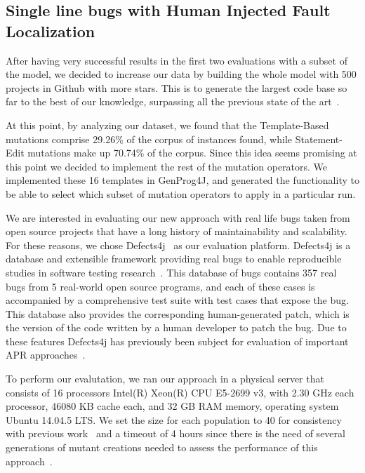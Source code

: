 \documentclass[conference]{IEEEtran}
\begin{document}
\subsection{Single line bugs with Human Injected Fault Localization}
\label{sec:single}

After having very successful results in the first two evaluations with a subset of the model, we decided 
to increase our data by building the whole model with 500 projects in Github with more 
stars. This is to generate the largest code base so far to the best 
of our knowledge, surpassing all the previous state of the 
art~\cite{long15,Soto15,zhong15,matias15,xuan16}. 

At this point, by analyzing our dataset, 
we found that the Template-Based mutations comprise 29.26\% of the corpus of 
instances found, while Statement-Edit mutations make up 70.74\% of the 
corpus. Since this idea seems promising at this point we decided to implement the rest 
of the mutation operators. We implemented these 16 templates in GenProg4J, and generated the functionality 
to be able to select which subset of mutation operators to apply in a particular 
run.

We are interested in evaluating our new approach with real life bugs taken from 
open source projects that have a long history of maintainability and 
scalability. For these reasons, we chose Defects4j~\cite{just14} as our 
evaluation platform. Defects4j is a database and extensible 
framework providing real bugs to enable reproducible studies in software testing 
research~\cite{just14}. This database of bugs contains 357 real bugs from 5 
real-world open source programs, and each of these cases is accompanied by a 
comprehensive test suite with test cases that expose the bug. This database also provides 
the corresponding human-generated patch, which is the version of the code written by a human 
developer to patch the bug. Due to these features Defects4j has previously been 
subject for evaluation of important APR approaches~\cite{Durieux15}.

To perform our evalutation, we ran our approach in a physical server that 
consists of 16 processors Intel(R) Xeon(R) CPU E5-2699 v3, with 2.30 GHz each 
processor, 46080 KB cache each, and 32 GB RAM memory, operating system Ubuntu 
14.04.5 LTS. We set the size for each population to 40 for consistency with 
previous work~\cite{legoues12,kim2013} and a timeout of 4 hours since there is 
the need of several generations of mutant creations needed to assess the 
performance of this approach~\cite{arcuri11}.
\end{document}
